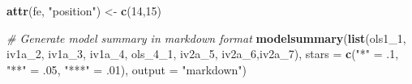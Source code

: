 \documentclass[
]{article}
\newenvironment{Shaded}{\begin{snugshade}}{\end{snugshade}}
\newcommand{\AttributeTok}[1]{\textcolor[rgb]{0.13,0.29,0.53}{#1}}
\newcommand{\CommentTok}[1]{\textcolor[rgb]{0.56,0.35,0.01}{\textit{#1}}}
\newcommand{\DecValTok}[1]{\textcolor[rgb]{0.00,0.00,0.81}{#1}}
\newcommand{\FunctionTok}[1]{\textcolor[rgb]{0.13,0.29,0.53}{\textbf{#1}}}
\newcommand{\NormalTok}[1]{#1}
\newcommand{\OtherTok}[1]{\textcolor[rgb]{0.56,0.35,0.01}{#1}}
\newcommand{\StringTok}[1]{\textcolor[rgb]{0.31,0.60,0.02}{#1}}
\begin{document}
\begin{Shaded}
\begin{Highlighting}[]
\FunctionTok{attr}\NormalTok{(fe, }\StringTok{"position"}\NormalTok{) }\OtherTok{\textless{}{-}} \FunctionTok{c}\NormalTok{(}\DecValTok{14}\NormalTok{,}\DecValTok{15}\NormalTok{)}

\CommentTok{\# Generate model summary in markdown format}
\FunctionTok{modelsummary}\NormalTok{(}\FunctionTok{list}\NormalTok{(ols1\_1, iv1a\_2, iv1a\_3, iv1a\_4, ols\_4\_1, iv2a\_5, iv2a\_6,iv2a\_7),}
             \AttributeTok{stars =} \FunctionTok{c}\NormalTok{(}\StringTok{"*"} \OtherTok{=}\NormalTok{ .}\DecValTok{1}\NormalTok{, }\StringTok{"**"} \OtherTok{=}\NormalTok{ .}\DecValTok{05}\NormalTok{, }\StringTok{"***"} \OtherTok{=}\NormalTok{ .}\DecValTok{01}\NormalTok{),}
             \AttributeTok{output =} \StringTok{"markdown"}\NormalTok{)}
\end{Highlighting}
\end{Shaded}
\end{document}
